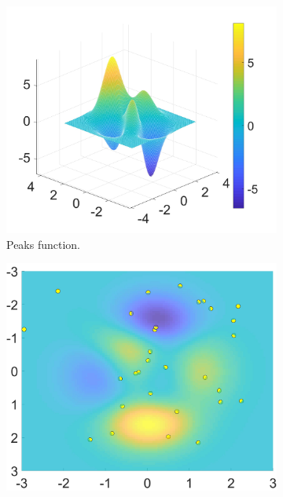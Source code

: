 \begin{figure}[hbp]
  \begin{subfigure}[b]{0.5\textwidth}
\includegraphics[width=\textwidth, height=\textwidth]{Part 2 - Search-Based Optimization/Particle Swarm Optimization/Images/FIG1.1.jpg}
    \caption{Peaks function.}
    \label{fig:f1}
  \end{subfigure}
  \hfill
  \begin{subfigure}[b]{0.5\textwidth}
    \includegraphics[width=\textwidth, height=\textwidth]{Part 2 - Search-Based Optimization/Particle Swarm Optimization/Images/FIG2.1.jpg}

\end{subfigure}
\end{figure}
